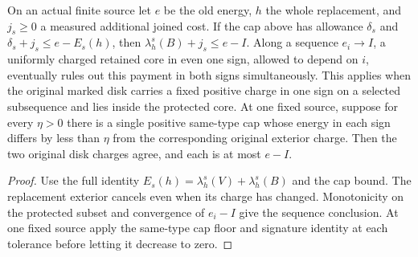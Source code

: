 \begin{proposition}
\label{prop:ed03-net-saving}
\leanok
On an actual finite source let $e$ be the old energy, $h$ the whole
replacement, and $j_s\ge0$ a measured additional joined cost. If the cap
above has allowance $\delta_s$ and $\delta_s+j_s\le e-E_s(h)$,
then $\lambda_h^s(B)+j_s\le e-I$. Along a sequence $e_i\to I$, a
uniformly charged retained core in even one sign, allowed to depend on $i$,
eventually rules out this payment in both signs simultaneously. This
applies when the original marked disk carries a fixed positive charge in
one sign on a selected subsequence and lies inside the protected core.
At one fixed source, suppose for every $\eta>0$ there is a single
positive same-type cap whose energy in each sign differs by less than
$\eta$ from the corresponding original exterior charge. Then the two
original disk charges agree, and each is at most $e-I$.
\end{proposition}
\begin{proof}
\leanok
Use the full identity $E_s(h)=\lambda_h^s(V)+\lambda_h^s(B)$ and the
cap bound. The replacement exterior cancels even when its charge has
changed. Monotonicity on the protected subset and convergence of $e_i-I$
give the sequence conclusion. At one fixed source apply the same-type cap
floor and signature identity at each tolerance before letting it decrease to zero.
\end{proof}

